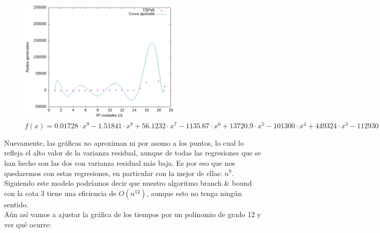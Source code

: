 \documentclass{article}
\begin{document}


\begin{figure}[H]
    \centering
    \includegraphics[width=0.7\textwidth]{imagenes/cota3/CurvaAjustada_n9_bb.png}
    \caption*{$f(x)=0.01728 \cdot x^9 -1.51841 \cdot x^8 + 56.1232 \cdot x^7 -1135.67  \cdot x^6 + 13720.9 \cdot x^5 -101300 \cdot x^4 + 449324 \cdot x^3 -112930 \cdot x^2 + 1417440 \cdot x -651607$}
\end{figure}




Nuevamente, las gráficas no aproximan ni por asomo a los puntos, lo cual lo refleja el alto valor de la varianza residual, aunque de todas las regresiones que se han hecho son las dos con varianza residual más baja. Es por eso que nos quedaremos con estas regresiones, en particular con la mejor de ellas: $n^9$. Siguiendo este modelo podríamos decir que nuestro algoritmo branch \& bound con la cota 3 tiene una eficiencia de $O(n^{12})$, aunque esto no tenga ningún sentido. \\

Aún así vamos a ajustar la gráfica de los tiempos por un polinomio de grado 12 y ver qué ocurre:


\end{document}
